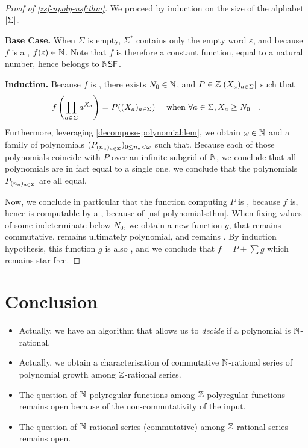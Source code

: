 \documentclass[a4paper,11pt]{article}
\begin{document}
\begin{proof}[Proof of \cref{zsf-npoly-nsf:thm}]
    We proceed by induction on the size of the alphabet $\card{\Sigma}$.

    \textbf{Base Case.} When $\Sigma$ is empty, $\Sigma^*$ contains
    only the empty word $\varepsilon$, and because $f$ is a
    , $f(\varepsilon) \in \mathbb{N}$.
    Note that $f$ is therefore a constant function, equal to a natural
    number, hence belongs to $\NSF$.

    
    \textbf{Induction.}
    Because $f$ is ,
    there exists $N_0 \in \mathbb{N}$, 
    and $P \in \mathbb{Z}[(X_a)_{a \in \Sigma}]$ 
    such that
    \begin{equation*}
        f\left( \prod_{a \in \Sigma} a^{X_a} \right)
        = 
        P((X_a)_{a \in \Sigma})
        \quad
        \text{ when }
        \forall a \in \Sigma, X_a \geq N_0
        \quad .
    \end{equation*}
    Furthermore, leveraging \cref{decompose-polynomial:lem},
    we obtain $\omega \in \mathbb{N}$
    and a family of polynomials 
    $(P_{(n_a)_{a \in \Sigma}})_{0 \leq n_a < \omega}$
    such that.
    Because each of those polynomials coincide with $P$ over an infinite
    subgrid of $\mathbb{N}$,
    we conclude that all polynomials are in fact equal to a single one.
    we conclude that the polynomials 
    $P_{(n_a)_{a \in \Sigma}}$ are all equal.

    Now, we conclude in particular that the function 
    computing $P$ is , because $f$ is,
    hence is computable by a ,
    because of \cref{nsf-polynomials:thm}.
    When fixing values of some indeterminate below $N_0$,
    we obtain a new function $g$, that remains commutative,
    remains ultimately polynomial, and remains .
    By induction hypothesis, this function $g$ is also 
    , and we conclude
    that 
    $f = P + \sum g$ which remains star free.
\end{proof}


\section{Conclusion}
\label{sec:ccl}

\begin{itemize}
    \item Actually, we have an algorithm that allows
        us to \emph{decide} if a polynomial is $\mathbb{N}$-rational.
    \item Actually, we obtain a characterisation of
        commutative 
        $\mathbb{N}$-rational series of polynomial growth
        among $\mathbb{Z}$-rational series.
    \item The question of $\mathbb{N}$-polyregular functions
        among $\mathbb{Z}$-polyregular functions remains open
        because of the non-commutativity of the input.
    \item The question of $\mathbb{N}$-rational series (commutative)
        among $\mathbb{Z}$-rational series remains open.
\end{itemize}
\end{document}
